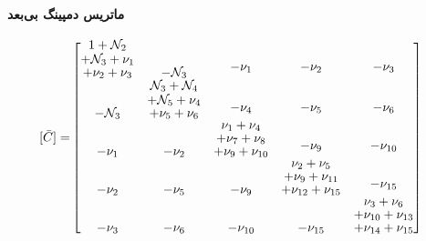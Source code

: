 \paragraph{ماتریس دمپینگ بی‌بعد}
\begin{equation}\label{Eq.damping_matrix_dimensionless}
\begin{aligned}
[\bar{C}] =& 
\begin{bmatrix}
\shortstack{$1 + \mathcal{N}_2$ \\ $+ \mathcal{N}_3 + \nu_1$ \\ $+ \nu_2 + \nu_3$} & -\mathcal{N}_3 & \shortstack{$-\nu_1$ \\ \,} & \shortstack{$-\nu_2$ \\ \,} & \shortstack{$-\nu_3$ \\ \,} \\
-\mathcal{N}_3 & \shortstack{$\mathcal{N}_3 + \mathcal{N}_4$ \\ $+ \mathcal{N}_5 + \nu_4$ \\ $+ \nu_5 + \nu_6$} & \shortstack{$-\nu_4$ \\ \,} & \shortstack{$-\nu_5$ \\ \,} & \shortstack{$-\nu_6$ \\ \,} \\
-\nu_1 & -\nu_2 & \shortstack{$\nu_1 + \nu_4$ \\ $+ \nu_7 + \nu_8$ \\ $+ \nu_9 + \nu_{10}$} & \shortstack{$-\nu_9$ \\ \,} & \shortstack{$-\nu_{10}$ \\ \,} \\
-\nu_2 & -\nu_5 & -\nu_9 & \shortstack{$\nu_2 + \nu_5$ \\ $+ \nu_9 + \nu_{11}$ \\ $+ \nu_{12} + \nu_{15}$} & \shortstack{$-\nu_{15}$ \\ \,} \\
-\nu_3 & -\nu_{6} & -\nu_{10} & -\nu_{15} & \shortstack{$\nu_3 + \nu_6$ \\ $+ \nu_{10} + \nu_{13}$ \\ $+ \nu_{14} + \nu_{15}$}
\end{bmatrix}
\end{aligned}
\end{equation}
